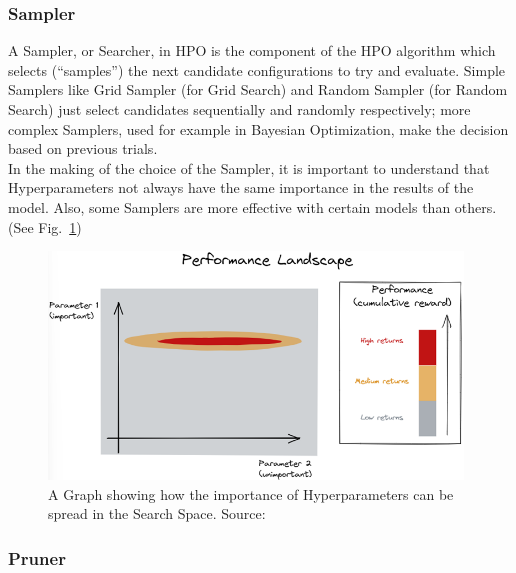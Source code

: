 \subsubsection{Sampler}

A Sampler, or Searcher, in HPO is the component of the HPO algorithm which selects (“samples”) the next candidate configurations to try and evaluate.
Simple Samplers like Grid Sampler (for Grid Search) and Random Sampler (for Random Search) just select candidates sequentially and randomly respectively; more complex Samplers, used for example in Bayesian Optimization, make the decision based on previous trials.
\\[0.3cm]In the making of the choice of the Sampler, it is important to understand that Hyperparameters not always have the same importance in the results of the model. Also, some Samplers are more effective with certain models than others. (See Fig.~\ref{fig:figure-2.1.1})
\begin{figure}[t]
	\centering
	\includegraphics[width=11cm]{figures/figure-2.1.1.png}
	\caption[Hyperparameters Importance]{A Graph showing how the importance of Hyperparameters can be spread in the Search Space. Source:~\cite{Tesi-1.3}}
	\label{fig:figure-2.1.1}
\end{figure}

\subsubsection{Pruner}

